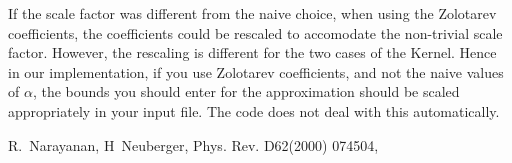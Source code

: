 \documentclass[12pt]{article}
\begin{document}
If the scale factor was different from the naive choice, when using
the Zolotarev coefficients, the coefficients could be rescaled
to accomodate the non-trivial scale factor. However, the rescaling
is different for the two cases of the Kernel. Hence in our 
implementation, if you use Zolotarev coefficients, and not the 
naive values of $\alpha$, the bounds you should enter for the 
approximation should be scaled appropriately in your input file.
The code does not deal with this automatically.


\begin{thebibliography}{99}
R.~Narayanan, H~Neuberger, Phys. Rev. D62(2000) 074504, 
\end{thebibliography}
\end{document}
